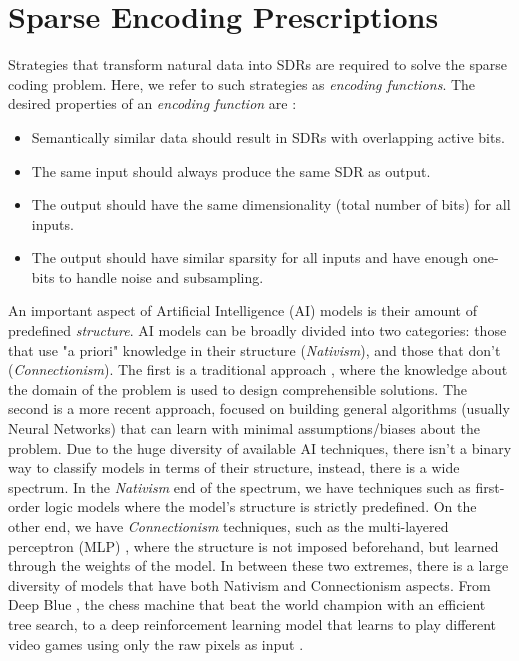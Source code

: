 \documentclass[runningheads]{llncs}
\begin{document}
\section{Sparse Encoding Prescriptions}
\label{sec:prescriptions}

Strategies that transform natural data into SDRs are required to solve the sparse
coding problem. Here, we refer to such strategies as \textit{encoding functions}.
The desired properties of an \textit{encoding function} are \cite{Hawkins-et-al-2016-Book}:
\begin{itemize}
    \item Semantically similar data should result in SDRs with overlapping active bits.
    \item The same input should always produce the same SDR as output.
    \item The output should have the same dimensionality (total number of bits) for all inputs.
    \item The output should have similar sparsity for all inputs and have enough one-bits to handle noise and subsampling.
\end{itemize}

An important aspect of Artificial Intelligence (AI) models is their amount of predefined \textit{structure}. AI models can be broadly divided into two categories: those that use "a priori" knowledge in their structure (\textit{Nativism}), and those that don't (\textit{Connectionism}).
The first is a traditional approach \cite{newell2007computer}, where the knowledge about the domain of the problem is used to design comprehensible solutions.
The second is a more recent approach, focused on building general algorithms (usually Neural Networks) that can learn with minimal assumptions/biases about the problem.
Due to the huge diversity of available AI techniques, there isn't a binary way to classify models in terms of their structure, instead, there is a wide spectrum.
In the \textit{Nativism} end of the spectrum, we have techniques such as first-order logic models \cite{mitchell1997machine} where the model's structure is strictly predefined.
On the other end, we have \textit{Connectionism} techniques, such as the multi-layered perceptron (MLP) \cite{hornik1989multilayer}, where the structure is not imposed beforehand, but learned through the weights of the model.
In between these two extremes, there is a large diversity of models that have both Nativism and Connectionism aspects. From Deep Blue \cite{campbell2002deep}, the chess machine that beat the world champion with an efficient tree search, to a deep reinforcement learning model that learns to play different video games using only the raw pixels as input  \cite{mnih2015human}.
\end{document}
